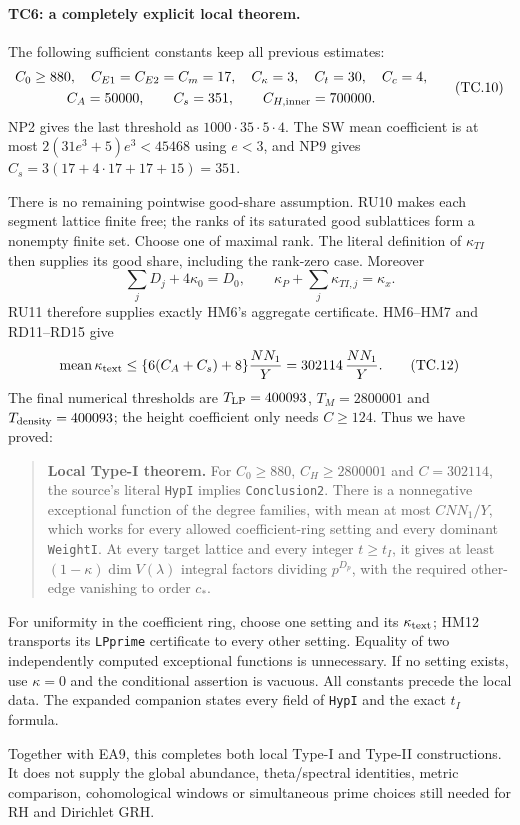 \paragraph{TC6: a completely explicit local theorem.}
The following sufficient constants keep all previous estimates:
\[
 \begin{gathered}
 C_0\ge880,\quad C_{E1}=C_{E2}=C_m=17,\quad
 C_\kappa=3,\quad C_t=30,\quad C_c=4,\\
 C_A=50000,\qquad C_s=351,\qquad C_{H,\rm inner}=700000.
 \end{gathered}                                         \tag{TC.10}
\]
NP2 gives the last threshold as $1000\cdot35\cdot5\cdot4$.
The SW mean coefficient is at most
$2(31e^3+5)e^3<45468$ using $e<3$, and NP9 gives
$C_s=3(17+4\cdot17+17+15)=351$.

There is no remaining pointwise good-share assumption.
RU10 makes each segment lattice finite free; the ranks of its
saturated good sublattices form a nonempty finite set. Choose
one of maximal rank. The literal definition of $\kappa_{TI}$
then supplies its good share, including the rank-zero case.
Moreover
\[
 \sum_jD_j+4\kappa_0=D_0,\qquad
 \kappa_P+\sum_j\kappa_{TI,j}=\kappa_x.                 \tag{TC.11}
\]
RU11 therefore supplies exactly HM6's aggregate certificate.
HM6--HM7 and RD11--RD15 give
\[
 \operatorname{mean}\kappa_{\rm text}
     \le \{6(C_A+C_s)+8\}\frac{NN_1}{Y}
     =302114\,\frac{NN_1}{Y}.                          \tag{TC.12}
\]
The final numerical thresholds are
$T_{\rm LP}=400093$, $T_M=2800001$ and
$T_{\rm density}=400093$; the height coefficient only needs
$C\ge124$. Thus we have proved:

\begin{quote}
\textbf{Local Type-I theorem.}
For $C_0\ge880$, $C_H\ge2800001$ and $C=302114$,
the source's literal \texttt{HypI} implies
\texttt{Conclusion2}.
There is a nonnegative exceptional function of the degree
families, with mean at most $CNN_1/Y$, which works for every
allowed coefficient-ring setting and every dominant
\texttt{WeightI}. At every target lattice and every integer
$t\ge t_I$, it gives at least
$(1-\kappa)\dim V(\lambda)$ integral factors dividing $p^{D_p}$,
with the required other-edge vanishing to order $c_*$.
\end{quote}

For uniformity in the coefficient ring, choose one setting and
its $\kappa_{\rm text}$; HM12 transports its \texttt{LPprime}
certificate to every other setting. Equality of two independently
computed exceptional functions is unnecessary. If no setting
exists, use $\kappa=0$ and the conditional assertion is vacuous.
All constants precede the local data. The expanded companion
states every field of \texttt{HypI} and the exact $t_I$ formula.

Together with EA9, this completes both local Type-I and Type-II
constructions. It does not supply the global abundance,
theta/spectral identities, metric comparison, cohomological
windows or simultaneous prime choices still needed for RH
and Dirichlet GRH.
